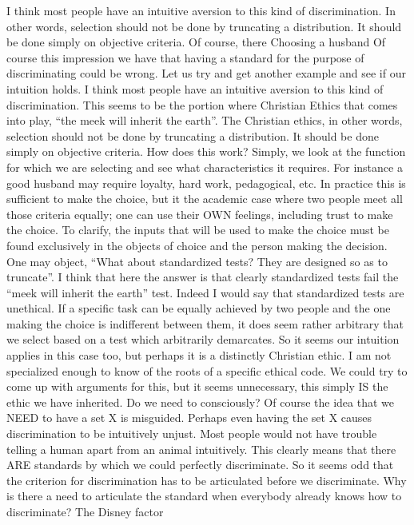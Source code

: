 I think most people have an intuitive aversion to this kind of discrimination. In other words, selection should not be done by truncating a distribution. It should be done simply on objective criteria. Of course, there
Choosing a husband
Of course this impression we have that having a standard for the purpose of discriminating could be wrong. Let us try and get another example and see if our intuition holds. 
I think most people have an intuitive aversion to this kind of discrimination. This seems to be the portion where Christian Ethics that comes into play, “the meek will inherit the earth”. The Christian ethics, in other words, selection should not be done by truncating a distribution. It should be done simply on objective criteria. 
How does this work? Simply, we look at the function for which we are selecting and see what characteristics it requires. For instance a good husband may require loyalty, hard work, pedagogical, etc.  In practice this is sufficient to make the choice, but it the academic case where two people meet all those criteria equally; one can use their OWN feelings, including trust to make the choice. 
To clarify, the inputs that will be used to make the choice must be found exclusively in the objects of choice and the person making the decision. 
One may object, “What about standardized tests? They are designed so as to truncate”. I think that here the answer is that clearly standardized tests fail the “meek will inherit the earth” test. Indeed I would say that standardized tests are unethical. If a specific task can be equally achieved by two people and the one making the choice is indifferent between them, it does seem rather arbitrary that we select based on a test which arbitrarily demarcates. 
So it seems our intuition applies in this case too, but perhaps it is a distinctly Christian ethic. I am not specialized enough to know of the roots of a specific ethical code. We could try to come up with arguments for this, but it seems unnecessary, this simply IS the ethic we have inherited. 
Do we need to consciously?
Of course the idea that we NEED to have a set X is misguided. Perhaps even having the set X causes discrimination to be intuitively unjust. Most people would not have trouble telling a human apart from an animal intuitively. This clearly means that there ARE standards by which we could perfectly discriminate. So it seems odd that the criterion for discrimination has to be articulated before we discriminate. Why is there a need to articulate the standard when everybody already knows how to discriminate? 
The Disney factor
